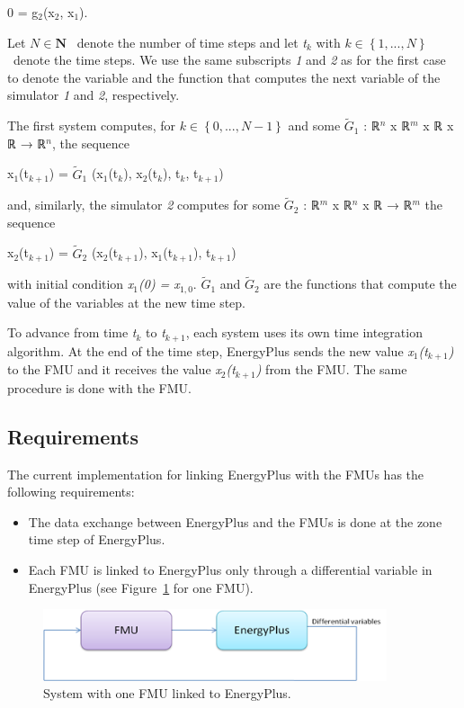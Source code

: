 0 = g\(_{2}\)(x\(_{2}\), x\(_{1}\)).

Let \(N\in\mathbf{N}\) ~denote the number of time steps and let \emph{t\(_{k}\)} with \(k\in\left\{1,...,N\right\}\) ~denote the time steps. We use the same subscripts \emph{1} and \emph{2} as for the first case to denote the variable and the function that computes the next variable of the simulator \emph{1} and \emph{2}, respectively.

The first system computes, for \(k\in\left\{0,...,N-1\right\}\) and some \(\tilde{G}_1\) : ℝ\(^{n}\) x ℝ\(^{m}\) x ℝ x ℝ → ℝ\(^{n}\), the sequence

x\(_{1}\)(t\(_{k+1}\)) = \(\tilde{G}_1\) (x\(_{1}\)(t\(_{k}\)), x\(_{2}\)(t\(_{k}\)), t\(_{k}\), t\(_{k+1}\))

and, similarly, the simulator \emph{2} computes for some \(\tilde{G}_2\) : ℝ\(^{m}\) x ℝ\(^{n}\) x ℝ → ℝ\(^{m}\) the sequence

x\(_{2}\)(t\(_{k+1}\)) = \(\tilde{G}_2\) (x\(_{2}\)(t\(_{k+1}\)), x\(_{1}\)(t\(_{k+1}\)), t\(_{k+1}\))

with initial condition \emph{x\(_{1}\)(0) = x\(_{1,0}\)}. \(\tilde{G}_1\) and \(\tilde{G}_2\) are the functions that compute the value of the variables at the new time step.

To advance from time \emph{t\(_{k}\)} to \emph{t\(_{k+1}\)}, each system uses its own time integration algorithm. At the end of the time step, EnergyPlus sends the new value \emph{x\(_{1}\)(t\(_{k+1}\))} to the FMU and it receives the value \emph{x\(_{2}\)(t\(_{k+1}\))} from the FMU. The same procedure is done with the FMU.

\subsection{Requirements}\label{requirements}

The current implementation for linking EnergyPlus with the FMUs has the following requirements:

\begin{itemize}
\item
  The data exchange between EnergyPlus and the FMUs is done at the zone time step of EnergyPlus.
\item
  Each FMU is linked to EnergyPlus only through a differential variable in EnergyPlus (see Figure~\ref{fig:system-with-one-fmu-linked-to-energyplus.-001} for one FMU).
\end{itemize}

\begin{figure}[hbtp] %
\centering
\includegraphics[width=0.9\textwidth, height=0.9\textheight, keepaspectratio=true]{media/image033.png}
\caption{System with one FMU linked to EnergyPlus. \protect \label{fig:system-with-one-fmu-linked-to-energyplus.-001}}
\end{figure}

